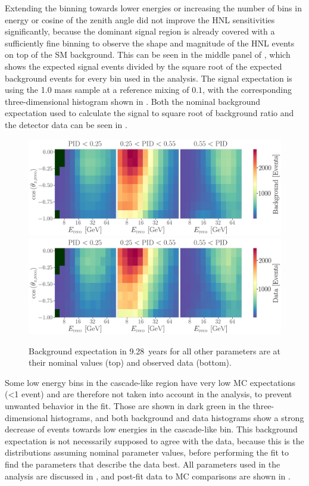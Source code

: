 Extending the binning towards lower energies or increasing the number of bins in energy or cosine of the zenith angle did not improve the HNL sensitivities significantly, because the dominant signal region is already covered with a sufficiently fine binning to observe the shape and magnitude of the HNL events on top of the SM background. This can be seen in the middle panel of , which shows the expected signal events divided by the square root of the expected background events for every bin used in the analysis. The signal expectation is using the \SI{1.0}{\gev} mass sample at a reference mixing of $0.1$, with the corresponding three-dimensional histogram shown in . Both the nominal background expectation used to calculate the signal to square root of background ratio and the detector data can be seen in .

\begin{figure}[h]
    \includegraphics{figures/results/3d_histograms/all_background.png}
    \includegraphics{figures/results/3d_histograms/all_data.png}
    \caption[Three-dimensional background expectation and observed data]{Background expectation in \SI{9.28}{years} for all other parameters are at their nominal values (top) and observed data (bottom).}
\end{figure}

Some low energy bins in the cascade-like region have very low MC expectations (<1 event) and are therefore not taken into account in the analysis, to prevent unwanted behavior in the fit. Those are shown in dark green in the three-dimensional histograms, and both background and data histograms show a strong decrease of events towards low energies in the cascade-like bin. This background expectation is not necessarily supposed to agree with the data, because this is the distributions assuming nominal parameter values, before performing the fit to find the parameters that describe the data best. All parameters used in the analysis are discussed in , and post-fit data to MC comparisons are shown in .


